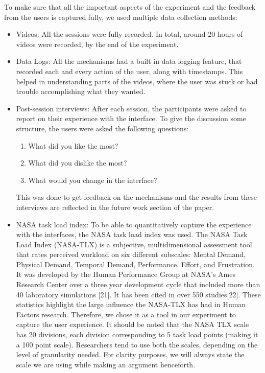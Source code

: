 To make sure that all the important aspects of the experiment and the
feedback from the users is captured fully, we used multiple data
collection methods:

\begin{itemize}
\item Videos: All the sessions were fully recorded. In total, around
  20 hours of videos were recorded, by the end of the experiment.
\item Data Logs: All the mechanisms had a built in data logging
  feature, that recorded each and every action of the user, along with
  timestamps. This helped in understanding parts of the videos, where
  the user was stuck or had trouble accomplishing what they wanted.
\item Post-session interviews: After each session, the participants
  were asked to report on their experience with the interface. To give
  the discussion some structure, the users were asked the following
  questions:

\begin{enumerate}
	\item What did you like the most?
	\item What did you dislike the most?
	\item What would you change in the interface?
\end{enumerate}

This was done to get feedback on the mechanisms and the results from these interviews are reflected in the future work section of the paper. 

\item NASA task load index: To be able to quantitatively capture the
  experience with the interfaces, the NASA task load index was
  used. The NASA Task Load Index (NASA-TLX) is a subjective,
  multidimensional assessment tool that rates perceived workload on
  six different subscales: Mental Demand, Physical Demand, Temporal
  Demand, Performance, Effort, and Frustration. It was developed by
  the Human Performance Group at NASA's Ames Research Center over a
  three year development cycle that included more than 40 laboratory
  simulations [21]. It has been cited in over 550
  studies[22]. These statistics highlight the
  large influence the NASA-TLX has had in Human Factors
  research. Therefore, we chose it as a tool in our experiment to
  capture the user experience. It should be noted that the NASA TLX scale has 20 divisions, each division corresponding to 5 task load points (making it a 100 point scale). Researchers tend to use both the scales, depending on the level of granularity needed. For clarity purposes, we will always state the scale we are using while making an argument henceforth. 

\end{itemize}
